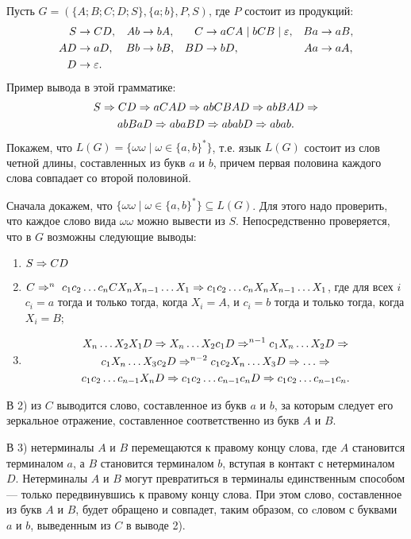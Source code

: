 \begin{myexample}
\label{exampleFreeGrammar}
Пусть $G=(\{A;B;C;D;S\},\{a;b\},P,S)$, где $P$ состоит из продукций:
\begin{align*}
	S  &\to CD, &
    Ab &\to bA, &
	C  &\to aCA \mid bCB \mid \varepsilon, &
    Ba &\to aB, \\
	AD &\to aD, &
    Bb &\to bB, &
	BD &\to bD, &
    Aa &\to aA,\\
	D  &\to \varepsilon. &&&
\end{align*}
Пример вывода в этой грамматике:
\begin{multline*}
	S \Rightarrow
    CD \Rightarrow 
    aCAD \Rightarrow
    abCBAD \Rightarrow 
    abBAD \Rightarrow \\
    abBaD \Rightarrow
    abaBD \Rightarrow 
    ababD \Rightarrow 
    abab.
\end{multline*}
Покажем, что $L(G)=\{\omega\omega\mid\omega\in\{a,b\}^*\}$, т.е. язык $L(G)$ состоит из слов четной длины, составленных из букв $a$ и $b$, причем первая половина каждого слова совпадает со второй половиной.

Сначала докажем, что $\{\omega\omega\mid\omega\in\{a,b\}^*\}\subseteq L(G)$. Для этого надо проверить, что каждое слово вида $\omega\omega$ можно вывести из $S$. Непосредственно проверяется, что в $G$ возможны следующие выводы:
\begin{enumerate}
	\item $S \Rightarrow CD$
	\item $C \Rightarrow^n~c_1c_2\ldots c_nCX_nX_{n-1}\ldots X_1 \Rightarrow c_1c_2\ldots c_nX_nX_{n-1}\ldots X_1$,  где для всех $i$ $c_i=a$ тогда и только тогда, когда $X_i=A$, и $c_i=b$ тогда и только тогда, когда $X_i=B$;
	\item
\begin{multline*}
    X_n\ldots X_2X_1D \To X_n\ldots X_2c_1D \To^{n-1} c_1X_n \ldots X_2D \To \\
     c_1X_n\ldots X_3c_2D \To^{n-2} c_1c_2X_n \ldots X_3D \To \dots \To \\
     c_1c_2\ldots c_{n-1}X_nD \To c_1c_2\ldots c_{n-1}c_nD \To c_1c_2\ldots c_{n-1}c_n.
\end{multline*}
\end{enumerate}

В 2) из $C$ выводится слово, составленное из букв $a$ и $b$, за которым следует его зеркальное отражение, составленное соответственно из букв $A$ и $B$.

В 3) нетерминалы $A$ и $B$ перемещаются к правому концу слова, где $A$ становится терминалом $a$, а $B$ становится терминалом $b$, вступая в контакт с нетерминалом $D$. Нетерминалы $A$ и $B$ могут превратиться в терминалы единственным способом --- только передвинувшись к правому концу слова. При этом слово, составленное из букв $A$ и $B$, будет обращено и совпадет, таким образом, со cловом с буквами $a$ и $b$, выведенным из $C$ в выводе 2).


\end{myexample}
